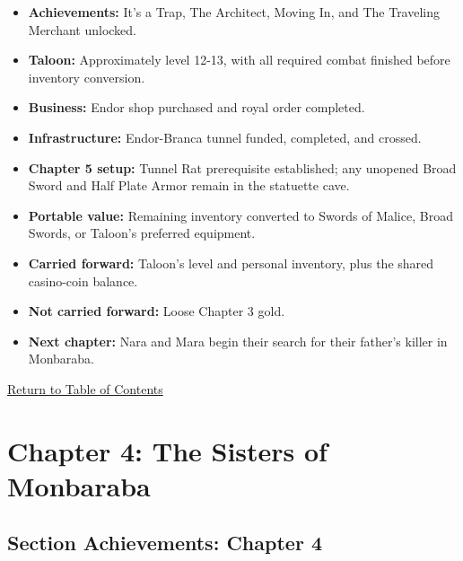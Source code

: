 \documentclass[
  american,
  10pt,
  letterpaper,
  oneside,
  open=any]{scrreprt}
\providecommand{\tightlist}{%
  \setlength{\itemsep}{0pt}\setlength{\parskip}{0pt}}
\begin{document}
\begin{itemize}
\tightlist
\item
  \textbf{Achievements:} It's a Trap, The Architect, Moving In, and The
  Traveling Merchant unlocked.
\item
  \textbf{Taloon:} Approximately level 12-13, with all required combat
  finished before inventory conversion.
\item
  \textbf{Business:} Endor shop purchased and royal order completed.
\item
  \textbf{Infrastructure:} Endor-Branca tunnel funded, completed, and
  crossed.
\item
  \textbf{Chapter 5 setup:} Tunnel Rat prerequisite established; any
  unopened Broad Sword and Half Plate Armor remain in the statuette
  cave.
\item
  \textbf{Portable value:} Remaining inventory converted to Swords of
  Malice, Broad Swords, or Taloon's preferred equipment.
\item
  \textbf{Carried forward:} Taloon's level and personal inventory, plus
  the shared casino-coin balance.
\item
  \textbf{Not carried forward:} Loose Chapter 3 gold.
\item
  \textbf{Next chapter:} Nara and Mara begin their search for their
  father's killer in Monbaraba.
\end{itemize}

\hyperref[table-of-contents]{Return to Table of Contents}

\chapter{Chapter 4: The Sisters of
Monbaraba}\label{chapter-4-the-sisters-of-monbaraba}

\section{Section Achievements: Chapter
4}\label{section-achievements-chapter-4}
\end{document}
